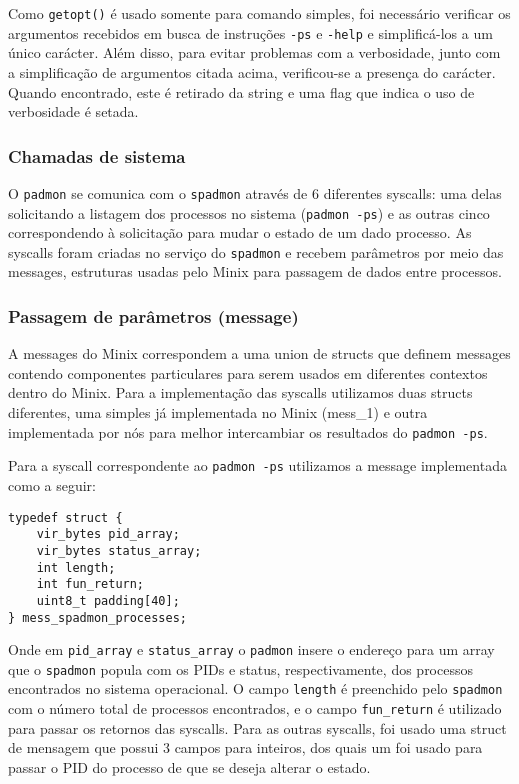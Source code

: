 \documentclass[12pt,journal,compsoc]{IEEEtran}
\begin{document}
Como \texttt{getopt()} é usado somente para comando simples, foi necessário verificar os argumentos recebidos em busca de instruções \texttt{-ps} e \texttt{-help} e simplificá-los a um único carácter. Além disso, para evitar problemas com a verbosidade, junto com a simplificação de argumentos citada acima, verificou-se a presença do carácter. Quando encontrado, este é retirado da string e uma flag que indica o uso de verbosidade é setada.

\subsubsection{Chamadas de sistema}
O \texttt{padmon} se comunica com o \texttt{spadmon} através de 6 diferentes syscalls: uma delas solicitando a listagem dos processos no sistema (\texttt{padmon -ps}) e as outras cinco correspondendo à solicitação para mudar o estado de um dado processo. 
As syscalls foram criadas no serviço do \texttt{spadmon} e recebem parâmetros por meio das messages, estruturas usadas pelo Minix para passagem de dados entre processos.

\subsubsection{Passagem de parâmetros (message)}
A messages do Minix correspondem a uma union de structs que definem messages contendo componentes particulares para serem usados em diferentes contextos dentro do Minix. 
Para a implementação das syscalls utilizamos duas structs diferentes, uma simples já implementada no Minix (mess\_1) e outra implementada por nós para melhor intercambiar os resultados do \texttt{padmon -ps}.

Para a syscall correspondente ao \texttt{padmon -ps} utilizamos a message implementada como a seguir:

\begin{verbatim}
typedef struct {
    vir_bytes pid_array;
    vir_bytes status_array;
    int length;
    int fun_return;
    uint8_t padding[40];
} mess_spadmon_processes;
\end{verbatim}

Onde em \texttt{pid\_array} e \texttt{status\_array} o \texttt{padmon} insere o endereço para um array que o \texttt{spadmon} popula com os PIDs e status, respectivamente, dos processos encontrados no sistema operacional. O campo \texttt{length} é preenchido pelo \texttt{spadmon} com o número total de processos encontrados, e o campo \texttt{fun\_return} é utilizado para passar os retornos das syscalls.
Para as outras syscalls, foi usado uma struct de mensagem que possui 3 campos para inteiros, dos quais um foi usado para passar o PID do processo de que se deseja alterar o estado.
\end{document}
